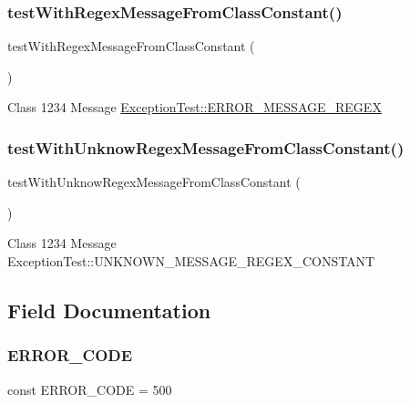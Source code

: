 \subsubsection{\texorpdfstring{test\+With\+Regex\+Message\+From\+Class\+Constant()}{testWithRegexMessageFromClassConstant()}}
{\footnotesize\ttfamily test\+With\+Regex\+Message\+From\+Class\+Constant (\begin{DoxyParamCaption}{ }\end{DoxyParamCaption})}

Class  1234  Message  \mbox{\hyperlink{class_exception_test_ad8e752fa8d9daa454f3042b2601154bd}{Exception\+Test\+::\+E\+R\+R\+O\+R\+\_\+\+M\+E\+S\+S\+A\+G\+E\+\_\+\+R\+E\+G\+EX}} \mbox{\label{class_exception_test_a70af11a9cde89b46892653dc75b1e739}} 
\subsubsection{\texorpdfstring{test\+With\+Unknow\+Regex\+Message\+From\+Class\+Constant()}{testWithUnknowRegexMessageFromClassConstant()}}
{\footnotesize\ttfamily test\+With\+Unknow\+Regex\+Message\+From\+Class\+Constant (\begin{DoxyParamCaption}{ }\end{DoxyParamCaption})}

Class  1234  Message  Exception\+Test\+::\+U\+N\+K\+N\+O\+W\+N\+\_\+\+M\+E\+S\+S\+A\+G\+E\+\_\+\+R\+E\+G\+E\+X\+\_\+\+C\+O\+N\+S\+T\+A\+NT 

\subsection{Field Documentation}
\mbox{\label{class_exception_test_a2e110b3c20c6a3b00cdda9e6dbc2d830}} 
\subsubsection{\texorpdfstring{E\+R\+R\+O\+R\+\_\+\+C\+O\+DE}{ERROR\_CODE}}
{\footnotesize\ttfamily const E\+R\+R\+O\+R\+\_\+\+C\+O\+DE = 500}

